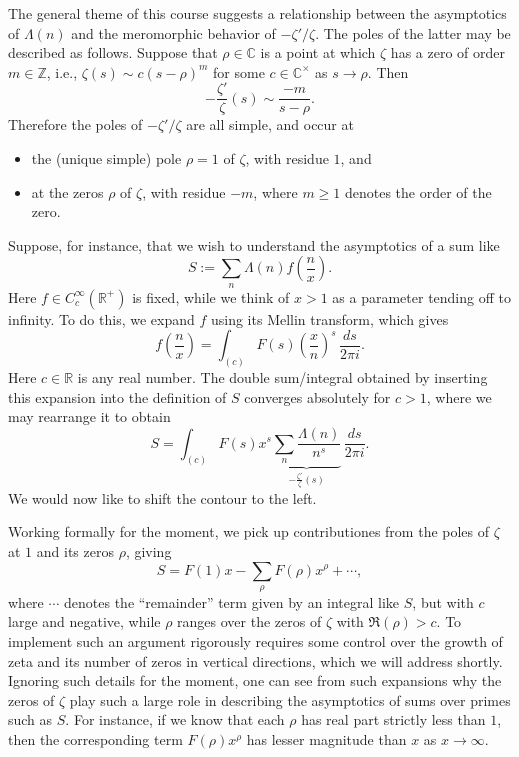 \documentclass[reqno]{amsart}  \numberwithin{theorem}{section} \numberwithin{equation}{section}
\begin{document}
The general theme of this course suggests a relationship between the asymptotics of $\Lambda(n)$ and the meromorphic behavior of $- \zeta ' / \zeta$.  The poles of the latter may be described as follows.  Suppose that $\rho \in \mathbb{C}$ is a point at which $\zeta$ has a zero of order $m \in \mathbb{Z}$, i.e., $\zeta(s) \sim c (s - \rho)^m$ for some $c \in \mathbb{C}^\times$ as $s \rightarrow \rho$.  Then
\begin{equation*}
  - \frac{\zeta'}{\zeta}(s) \sim \frac{- m }{s - \rho}.
\end{equation*}
Therefore the poles of $- \zeta ' / \zeta $ are all simple, and occur at
\begin{itemize}
\item the (unique simple) pole $\rho = 1$ of $\zeta$, with residue $1$, and
\item at the zeros $\rho$ of $\zeta$, with residue $-m$, where $m \geq 1$ denotes the order of the zero.
\end{itemize}

Suppose, for instance, that we wish to understand the asymptotics of a sum like
\begin{equation*}
  S := \sum_n \Lambda (n) f \left( \frac{n}{x} \right).
\end{equation*}
Here $f \in C_c^\infty (\mathbb{R}^+ )$ is fixed, while we think of $x > 1$ as a parameter tending off to infinity.  To do this, we expand $f$ using its Mellin transform, which gives
\begin{equation*}
  f \left( \frac{n}{x} \right) = \int_{(c)} F (s) \left( \frac{x}{n} \right)^s \, \frac{d s}{2 \pi i}.
\end{equation*}
Here $c \in \mathbb{R}$ is any real number.  The double sum/integral obtained by inserting this expansion into the definition of $S$ converges absolutely for $c > 1$, where we may rearrange it to obtain
\begin{equation}\label{eq:cj42xpi3f4}
  S = \int_{(c)} F (s) x^s \underbrace
  {
    \sum_n 
    \frac{\Lambda (n)}{ n^s } 
  }_{
    - \frac{\zeta ' }{\zeta }(s)
  }\, \frac{d s}{2 \pi i}.
\end{equation}
We would now like to shift the contour to the left.

Working formally for the moment, we pick up contributiones from the poles of $\zeta$ at $1$ and its zeros $\rho$, giving
\begin{equation*}
  S =
  F(1) x
  -
  \sum_{\rho}
  F(\rho) x^\rho
  +
  \dotsb,
\end{equation*}
where $\dotsb$ denotes the ``remainder'' term given by an integral like $S$, but with $c$ large and negative, while $\rho$ ranges over the zeros of $\zeta$ with $\Re(\rho) > c$.  To implement such an argument rigorously requires some control over the growth of zeta and its number of zeros in vertical directions, which we will address shortly.  Ignoring such details for the moment, one can see from such expansions why the zeros of $\zeta$ play such a large role in describing the asymptotics of sums over primes such as $S$.  For instance, if we know that each $\rho$ has real part strictly less than $1$, then the corresponding term $F(\rho) x^\rho$ has lesser magnitude than $x$ as $x \rightarrow \infty$.
\end{document}
